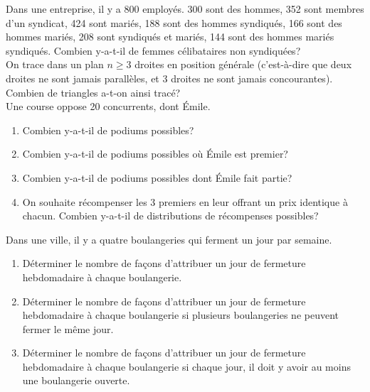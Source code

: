 \documentclass[../PolyS4.tex]{subfiles}
\begin{document}
\vskip0.2cm
Dans une entreprise, il y a 800 employés. 300 sont des hommes, 352 sont membres d'un syndicat, 424 sont mariés, 188 sont des hommes syndiqués, 166 sont des hommes mariés, 208 sont syndiqués et mariés, 144 sont des hommes mariés syndiqués. Combien y-a-t-il de femmes célibataires non syndiquées?\\





\vskip0.2cm
On trace dans un plan $n\geq 3$ droites en position générale (c'est-à-dire que deux droites ne sont jamais parallèles, et 3 droites ne sont jamais concourantes). Combien de triangles a-t-on ainsi tracé?\\





\vskip0.2cm
Une course oppose 20 concurrents, dont \'Emile.
\begin{enumerate}
 \item Combien y-a-t-il de podiums possibles?
\item Combien y-a-t-il de podiums possibles où \'Emile est premier?
\item Combien y-a-t-il de podiums possibles dont \'Emile fait partie?
 \item On souhaite récompenser les 3 premiers en leur offrant un prix identique à chacun. Combien y-a-t-il de distributions de récompenses possibles?\\
\end{enumerate}




\vskip0.2cm
Dans une ville, il y a quatre boulangeries qui ferment un jour par semaine.\\
\begin{enumerate}
\item Déterminer le nombre de façons d'attribuer un jour de fermeture hebdomadaire à chaque boulangerie.
\item Déterminer le nombre de façons d'attribuer un jour de fermeture hebdomadaire à chaque boulangerie si plusieurs boulangeries ne peuvent fermer le même jour.
\item Déterminer le nombre de façons d'attribuer un jour de fermeture hebdomadaire à chaque boulangerie si chaque jour, il doit y avoir au moins une boulangerie ouverte.\\
\end{enumerate}
\end{document}
